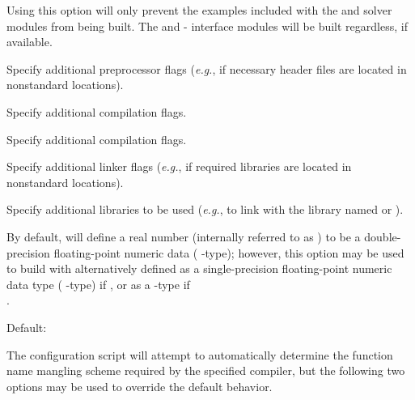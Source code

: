 \begin{config}
  Using this option will only prevent the {\F} examples included with the
  {\kinsol} and {\cvode} solver modules from being built. The {\fkinsol}
  and {\fcvode} {\F}-{\C} interface modules will be built regardless, if
  available.

\item {}

  Specify additional {\C} preprocessor flags 
  ({\em e.g.},  if necessary header files are located in nonstandard locations).

\item {}

  Specify additional {\C} compilation flags.

\item {}

  Specify additional {\F} compilation flags.

\item {}

  Specify additional linker flags 
  ({\em e.g.},  if required libraries are located in nonstandard locations).

\item {}

  Specify additional libraries to be used 
  ({\em e.g.},  to link with the library named  or ).

\item {}

  By default, {\sundials} will define a real number (internally referred to as
  ) to be a double-precision floating-point numeric data (
  {\C}-type); however, this option may be used to build {\sundials} with 
  alternatively defined as a single-precision floating-point numeric data type
  ( {\C}-type) if , or as a  {\C}-type
  if \\ .

  Default: 

\end{config}

\vspace{0.25in}
\noindent The configuration script will attempt to automatically determine the
function name mangling scheme required by the specified {\F} compiler, but the
following two options may be used to override the default behavior.

